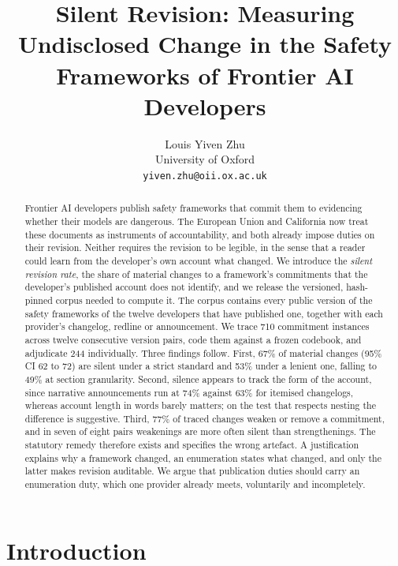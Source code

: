 \documentclass{article}
\title{Silent Revision: Measuring Undisclosed Change in the Safety Frameworks of Frontier AI Developers}
\author{Louis Yiven Zhu\\ University of Oxford\\ \texttt{yiven.zhu@oii.ox.ac.uk}}
\begin{document}
\maketitle

\begin{abstract}
Frontier AI developers publish safety frameworks that commit them to evidencing whether their models are dangerous. The European Union and California now treat these documents as instruments of accountability, and both already impose duties on their revision. Neither requires the revision to be legible, in the sense that a reader could learn from the developer's own account what changed. We introduce the \emph{silent revision rate}, the share of material changes to a framework's commitments that the developer's published account does not identify, and we release the versioned, hash-pinned corpus needed to compute it. The corpus contains every public version of the safety frameworks of the twelve developers that have published one, together with each provider's changelog, redline or announcement. We trace 710 commitment instances across twelve consecutive version pairs, code them against a frozen codebook, and adjudicate 244 individually. Three findings follow. First, 67\% of material changes (95\% CI 62 to 72) are silent under a strict standard and 53\% under a lenient one, falling to 49\% at section granularity. Second, silence appears to track the form of the account, since narrative announcements run at 74\% against 63\% for itemised changelogs, whereas account length in words barely matters; on the test that respects nesting the difference is suggestive. Third, 77\% of traced changes weaken or remove a commitment, and in seven of eight pairs weakenings are more often silent than strengthenings. The statutory remedy therefore exists and specifies the wrong artefact. A justification explains why a framework changed, an enumeration states what changed, and only the latter makes revision auditable. We argue that publication duties should carry an enumeration duty, which one provider already meets, voluntarily and incompletely.
\end{abstract}

\section{Introduction}
\label{sec:intro}
\end{document}
